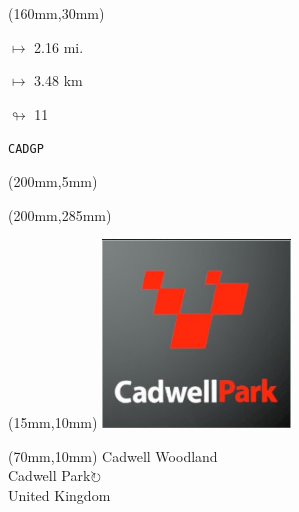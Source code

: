 \begin{textblock*}{40mm}(160mm,30mm)%
\Large
\par$\mapsto$ 2.16 mi.
\par$\mapsto$ 3.48 km
\par$\looparrowright$ 11
\par\hfill\tiny\tt CADGP\\
\end{textblock*}
\begin{textblock*}{20mm}(200mm,5mm)%
\fbox{\thepage}
\label{CADGP}
\end{textblock*}
\begin{textblock*}{20mm}(200mm,285mm)%
\fbox{\thepage}
\end{textblock*}

\null\newpage
\begin{textblock*}{50mm}(15mm,10mm)%
\includegraphics[width=50mm]{LG/2015-05-20_00076.png}
\end{textblock*}
\begin{textblock*}{130mm}(70mm,10mm)%
{\fontsize{20}{20}\selectfont Cadwell Woodland\\}
{\fontsize{16}{16}\selectfont Cadwell Park\hfill \Large$\circlearrowright$\\}
{\fontsize{12}{12}\selectfont United Kingdom\\}
\end{textblock*}
